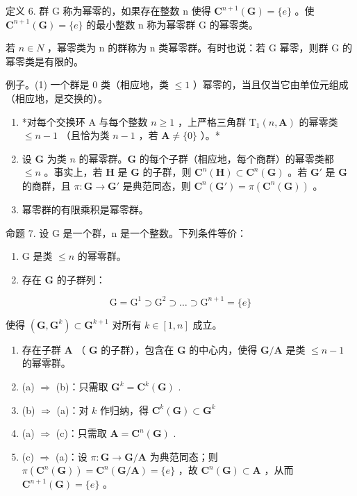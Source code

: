 定义 6. 群 G 称为幂零的，如果存在整数 n 使得 \(\mathbf{C}^{n+1}(\mathbf{G}) = \{e\}\) 。使 \(\mathbf{C}^{n+1}(\mathbf{G}) = \{e\}\) 的最小整数 n 称为幂零群 G 的幂零类。

若 \(n \in N\) ，幂零类为 n 的群称为 n 类幂零群。有时也说：若 G 幂零，则群 G 的幂零类是有限的。

例子。(1) 一个群是 0 类（相应地，类 \(\leqslant 1\) ）幂零的，当且仅当它由单位元组成（相应地，是交换的）。

\begin{enumerate}
\def\labelenumi{(\arabic{enumi})}
\setcounter{enumi}{1}
\item
  *对每个交换环 A 与每个整数 \(n \geqslant 1\) ，上严格三角群 \(\mathrm{T}_1(n, \mathbf{A})\) 的幂零类 \(\leqslant n - 1\) （且恰为类 \(n - 1\) ，若 \(\mathbf{A} \neq \{0\}\) ）。*
\item
  设 \(\mathbf{G}\) 为类 \(n\) 的幂零群。\(\mathbf{G}\) 的每个子群（相应地，每个商群）的幂零类都 \(\leqslant n\) 。事实上，若 \(\mathbf{H}\) 是 \(\mathbf{G}\) 的子群，则 \(\mathbf{C}^n (\mathbf{H})\subset \mathbf{C}^n (\mathbf{G})\) 。若 \(\mathbf{G}'\) 是 \(\mathbf{G}\) 的商群，且 \(\pi : \mathbf{G}\to \mathbf{G}'\) 是典范同态，则 \(\mathbf{C}^n (\mathbf{G}') = \pi (\mathbf{C}^n (\mathbf{G}))\) 。
\item
  幂零群的有限乘积是幂零群。
\end{enumerate}

命题 7. 设 G 是一个群，n 是一个整数。下列条件等价：

\begin{enumerate}
\def\labelenumi{(\alph{enumi})}
\item
  G 是类 \(\leqslant n\) 的幂零群。
\item
  存在 \(\mathbf{G}\) 的子群列：
\end{enumerate}

\[
\mathrm{G} = \mathrm{G} ^ {1} \supset \mathrm{G} ^ {2} \supset \dots \supset \mathrm{G} ^ {n + 1} = \{e \}
\]

使得 \((\mathbf{G},\mathbf{G}^k)\subset \mathbf{G}^{k + 1}\) 对所有 \(k\in [1,n]\) 成立。

\begin{enumerate}
\def\labelenumi{(\alph{enumi})}
\setcounter{enumi}{2}
\item
  存在子群 \(\mathbf{A}\) （ \(\mathbf{G}\) 的子群），包含在 \(\mathbf{G}\) 的中心内，使得 \(\mathbf{G} / \mathbf{A}\) 是类 \(\leqslant n - 1\) 的幂零群。
\item
  (a) \(\Rightarrow\) (b)：只需取 \(\mathbf{G}^k = \mathbf{C}^k (\mathbf{G})\) .
\item
  (b) \(\Rightarrow\) (a)：对 \(k\) 作归纳，得 \(\mathbf{C}^k (\mathbf{G})\subset \mathbf{G}^k\)
\item
  (a) \(\Rightarrow\) (c)：只需取 \(\mathbf{A} = \mathbf{C}^n (\mathbf{G})\) .
\item
  (c) \(\Rightarrow\) (a)：设 \(\pi: \mathbf{G} \to \mathbf{G} / \mathbf{A}\) 为典范同态；则 \(\pi(\mathbf{C}^n(\mathbf{G})) = \mathbf{C}^n(\mathbf{G} / \mathbf{A}) = \{e\}\) ，故 \(\mathbf{C}^n(\mathbf{G}) \subset \mathbf{A}\) ，从而 \(\mathbf{C}^{n+1}(\mathbf{G}) = \{e\}\) 。
\end{enumerate}

